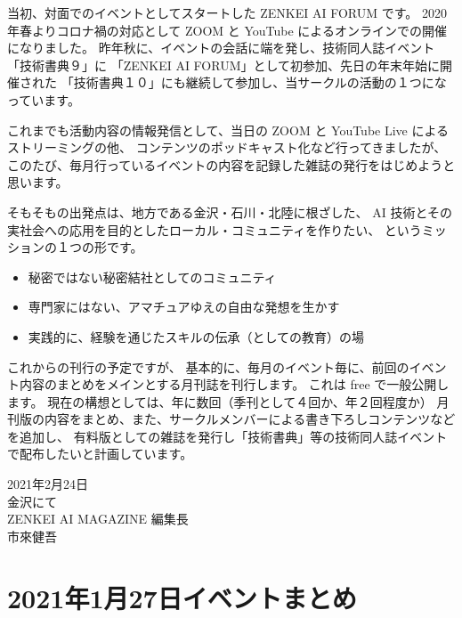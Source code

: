 \documentclass[dvipdfmx,autodetect-engine,10pt,b5paper,papersize,openany,dvipsnames]{jsbook}
\begin{document}
\begin{multicols}{2}

当初、対面でのイベントとしてスタートした ZENKEI AI FORUM です。
2020年春よりコロナ禍の対応として ZOOM と YouTube によるオンラインでの開催になりました。
昨年秋に、イベントの会話に端を発し、技術同人誌イベント「技術書典９」に
「ZENKEI AI FORUM」として初参加、先日の年末年始に開催された
「技術書典１０」にも継続して参加し、当サークルの活動の１つになっています。

これまでも活動内容の情報発信として、当日の ZOOM と YouTube Live によるストリーミングの他、
コンテンツのポッドキャスト化など行ってきましたが、
このたび、毎月行っているイベントの内容を記録した雑誌の発行をはじめようと思います。

そもそもの出発点は、地方である金沢・石川・北陸に根ざした、
AI 技術とその実社会への応用を目的としたローカル・コミュニティを作りたい、
というミッションの１つの形です。

\begin{itemize}
\item 秘密ではない秘密結社としてのコミュニティ
\item 専門家にはない、アマチュアゆえの自由な発想を生かす
\item 実践的に、経験を通じたスキルの伝承（としての教育）の場
\end{itemize}

これからの刊行の予定ですが、
基本的に、毎月のイベント毎に、前回のイベント内容のまとめをメインとする月刊誌を刊行します。
これは free で一般公開します。
現在の構想としては、年に数回（季刊として４回か、年２回程度か）
月刊版の内容をまとめ、また、サークルメンバーによる書き下ろしコンテンツなどを追加し、
有料版としての雑誌を発行し「技術書典」等の技術同人誌イベントで配布したいと計画しています。

\begin{flushright}
  2021年2月24日\\
  金沢にて\\
  ZENKEI AI MAGAZINE 編集長\\
  市來健吾
\end{flushright}

\end{multicols}

\newpage

\chapter*{2021年1月27日イベントまとめ}
\thispagestyle{fancy}
\end{document}
